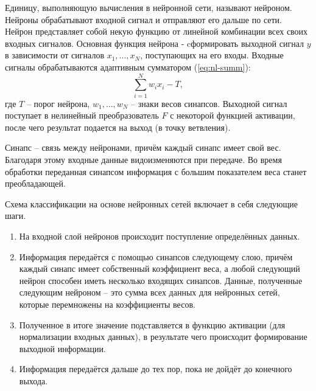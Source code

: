 Единицу, выполняющую вычисления в нейронной сети, называют нейроном. Нейроны обрабатывают входной сигнал и отправляют его дальше по сети. Нейрон представляет собой некую функцию от линейной комбинации всех своих входных сигналов. Основная функция нейрона - cформировать выходной сигнал $y$ в зависимости от сигналов $x_1, \dots, x_N$, поступающих на его входы. Входные сигналы обрабатываются адаптивным сумматором (\ref{eq:nl-summ}):
\begin{equation}\label{eq:nl-summ}
	\sum_{i = 1}^{N} w_ix_i - T,
\end{equation}
где $T$ -- порог нейрона, $w_1, \dots, w_N$ -- знаки весов синапсов. Выходной сигнал поступает в нелинейный преобразователь $F$ с некоторой функцией активации, после чего результат подается на выход (в точку ветвления).

Синапс -- связь между нейронами, причём каждый синапс имеет свой вес. Благодаря этому входные данные видоизменяются при передаче. Во время обработки переданная синапсом информация с большим показателем веса станет преобладающей.

Схема классификации на основе нейронных сетей включает в себя следующие шаги.
\begin{enumerate}
	\item На входной слой нейронов происходит поступление определённых данных.
	\item Информация передаётся с помощью синапсов следующему слою, причём каждый синапс имеет собственный коэффициент веса, а любой следующий нейрон способен иметь несколько входящих синапсов. Данные, полученные следующим нейроном -- это сумма всех данных для нейронных сетей, которые перемножены на коэффициенты весов.
	\item Полученное в итоге значение подставляется в функцию активации (для нормализации входных данных), в результате чего происходит формирование выходной информации.
	\item Информация передаётся дальше до тех пор, пока не дойдёт до конечного выхода.
\end{enumerate}	

